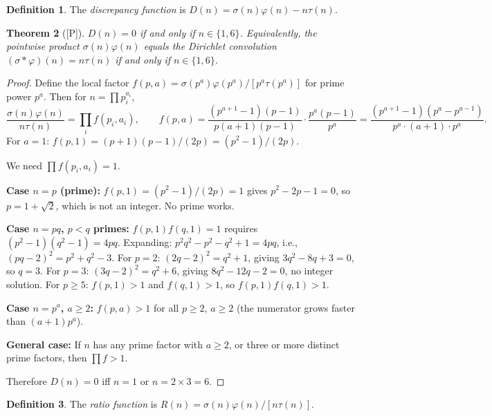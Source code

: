 \documentclass[11pt,letterpaper]{article}
\newtheorem{theorem}{Theorem}[section]
\theoremstyle{definition}
\newtheorem{definition}[theorem]{Definition}
\theoremstyle{remark}
\newcommand{\proven}{\textsf{[P]}}
\begin{document}
\begin{definition}
The \emph{discrepancy function} is $D(n) = \sigma(n)\varphi(n) - n\tau(n)$.
\end{definition}

\begin{theorem}[\proven]\label{thm:conv-collapse}
$D(n) = 0$ if and only if $n \in \{1, 6\}$.
Equivalently, the pointwise product $\sigma(n)\varphi(n)$ equals 
the Dirichlet convolution $(\sigma * \varphi)(n) = n\tau(n)$ 
if and only if $n \in \{1,6\}$.
\end{theorem}

\begin{proof}
Define the local factor $f(p,a) = \sigma(p^a)\varphi(p^a)/[p^a \tau(p^a)]$ 
for prime power $p^a$. Then for $n = \prod p_i^{a_i}$,
\begin{equation}
\frac{\sigma(n)\varphi(n)}{n\tau(n)} = \prod_i f(p_i, a_i), \qquad
f(p,a) = \frac{(p^{a+1}-1)(p-1)}{p(a+1)(p-1)} \cdot \frac{p^a(p-1)}{p^a} 
= \frac{(p^{a+1}-1)(p^a - p^{a-1})}{p^a \cdot (a+1) \cdot p^a}.
\end{equation}
For $a=1$: $f(p,1) = (p+1)(p-1)/(2p) = (p^2-1)/(2p)$.

We need $\prod f(p_i,a_i) = 1$.

\textbf{Case $n = p$ (prime):} $f(p,1) = (p^2-1)/(2p) = 1$ gives $p^2 - 2p - 1 = 0$, 
so $p = 1 + \sqrt{2}$, which is not an integer. No prime works.

\textbf{Case $n = pq$, $p < q$ primes:}
$f(p,1)f(q,1) = 1$ requires $(p^2-1)(q^2-1) = 4pq$.
Expanding: $p^2q^2 - p^2 - q^2 + 1 = 4pq$, i.e., $(pq-2)^2 = p^2+q^2-3$.
For $p=2$: $(2q-2)^2 = q^2+1$, giving $3q^2 - 8q + 3 = 0$, so $q = 3$.
For $p=3$: $(3q-2)^2 = q^2+6$, giving $8q^2-12q-2=0$, no integer solution.
For $p \geq 5$: $f(p,1) > 1$ and $f(q,1) > 1$, so $f(p,1)f(q,1)>1$.

\textbf{Case $n = p^a$, $a \geq 2$:}
$f(p,a) > 1$ for all $p \geq 2$, $a \geq 2$ (the numerator grows faster 
than $(a+1)p^a$).

\textbf{General case:} If $n$ has any prime factor with $a \geq 2$, or 
three or more distinct prime factors, then $\prod f > 1$.

Therefore $D(n)=0$ iff $n=1$ or $n = 2\times 3 = 6$.
\end{proof}

\begin{definition}
The \emph{ratio function} is $R(n) = \sigma(n)\varphi(n)/[n\tau(n)]$.
\end{definition}
\end{document}
